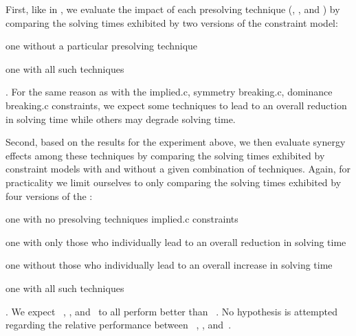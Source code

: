 \def\modelA{\textsc{i}}
\def\modelB{\textsc{ii}}

First, like in , we evaluate the impact of each
\gls{presolving} technique (,
,
and ) by comparing the solving times
exhibited by two versions of the \gls{constraint model}:
%
\begin{modelList}
  \item {}
    one without a particular \gls{presolving} technique
  \item {}
    one with all such techniques
\end{modelList}.
%
For the same reason as with the \gls{implied.c}, \gls{symmetry breaking.c},
\gls{dominance breaking.c} \glspl{constraint}, we expect some techniques to lead
to an overall reduction in solving time while others may degrade solving time.

\def\modelC{\textsc{iii}}
\def\modelD{\textsc{iv}}
\def\modelE{\textsc{v}}
\def\modelF{\textsc{vi}}

Second, based on the results for the experiment above, we then evaluate synergy
effects among these techniques by comparing the solving times exhibited by
\glspl{constraint model} with and without a given combination of techniques.
%
Again, for practicality we limit ourselves to only comparing the solving times
exhibited by four versions of the :
%
\begin{modelList}[resume]
  \item {}
    one with no \gls{presolving} techniques
\gls{implied.c} \glspl{constraint}
  \item {}
    one with only those who individually lead to an overall reduction in solving
    time
  \item {}
    one without those who individually lead to an overall increase in solving
    time
  \item {}
    one with all such techniques
\end{modelList}.
%
We expect ~,
, and~ to all perform
better than ~.
%
No hypothesis is attempted regarding the relative performance between
~,
, and~.


